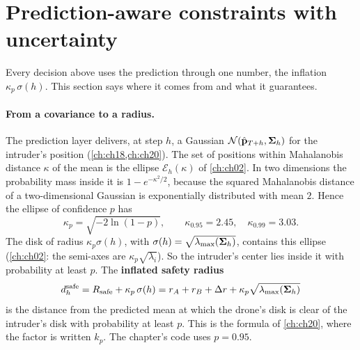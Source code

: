 \section[Prediction-aware constraints]{Prediction-aware constraints with uncertainty}
\label{sec:ch24-uncertainty}

Every decision above uses the prediction through one number, the inflation
$\kappa_p\,\sigma(h)$. This section says where it comes from and what it
guarantees.

\paragraph{From a covariance to a radius.}
The prediction layer delivers, at step $h$, a Gaussian
$\mathcal{N}(\hat{\mathbf{p}}_{T+h}, \mathbf{\Sigma}_h)$ for the intruder's position
(\cref{ch:ch18,ch:ch20}). The set of positions within Mahalanobis distance
$\kappa$ of the mean is the ellipse $\mathcal{E}_h(\kappa)$ of \cref{ch:ch02}.
In two dimensions the probability mass inside it is $1 - e^{-\kappa^2/2}$,
because the squared Mahalanobis distance of a two-dimensional Gaussian is
exponentially distributed with mean $2$. Hence
the ellipse of confidence $p$ has
\begin{equation}
  \kappa_p = \sqrt{-2\ln(1 - p)},\qquad \kappa_{0.95} = 2.45,\quad \kappa_{0.99} = 3.03.
  \label{eq:ch24-kappa}
\end{equation}
The disk of radius $\kappa_p\sigma(h)$, with $\sigma(h) = \sqrt{\lambda_{\max}(\mathbf{\Sigma}_h)}$,
contains this ellipse (\cref{ch:ch02}: the semi-axes are
$\kappa_p\sqrt{\lambda_i}$). So the intruder's center lies inside it with
probability at least $p$. The \textbf{inflated safety
radius}
\begin{equation}
  d^{\mathrm{safe}}_h = R_{\mathrm{safe}} + \kappa_p\,\sigma(h) = r_A + r_B + \Delta r + \kappa_p\sqrt{\lambda_{\max}(\mathbf{\Sigma}_h)}
  \label{eq:ch24-inflated}
\end{equation}
is the distance from the predicted mean at which the drone's disk is clear
of the intruder's disk with probability at least $p$. This is the formula
of \cref{ch:ch20}, where the factor is written $k_p$. The chapter's code
uses $p = 0.95$.

